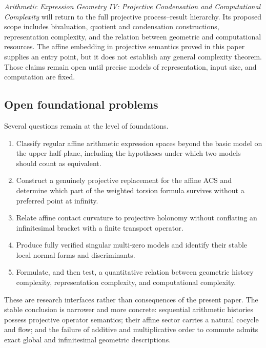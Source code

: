 \emph{Arithmetic Expression Geometry IV: Projective Condensation and
Computational Complexity} will return to the full projective process--result
hierarchy.  Its proposed scope includes bivaluation, quotient and condensation
constructions, representation complexity, and the relation between geometric
and computational resources.  The affine embedding in projective semantics
proved in this paper supplies an entry point, but it does not establish any
general complexity theorem.  Those claims remain open until precise models of
representation, input size, and computation are fixed.

\subsection{Open foundational problems}

Several questions remain at the level of foundations.
\begin{enumerate}
    \item Classify regular affine arithmetic expression spaces beyond the basic
    model on the upper half-plane, including the hypotheses under which two
    models should count as equivalent.
    \item Construct a genuinely projective replacement for the affine ACS and
    determine which part of the weighted torsion formula survives without a
    preferred point at infinity.
    \item Relate affine contact curvature to projective holonomy without
    conflating an infinitesimal bracket with a finite transport operator.
    \item Produce fully verified singular multi-zero models and identify their
    stable local normal forms and discriminants.
    \item Formulate, and then test, a quantitative relation between geometric
    history complexity, representation complexity, and computational
    complexity.
\end{enumerate}

These are research interfaces rather than consequences of the present paper.
The stable conclusion is narrower and more concrete: sequential arithmetic
histories possess projective operator semantics; their affine sector carries a
natural cocycle and flow; and the failure of additive and multiplicative order
to commute admits exact global and infinitesimal geometric descriptions.
